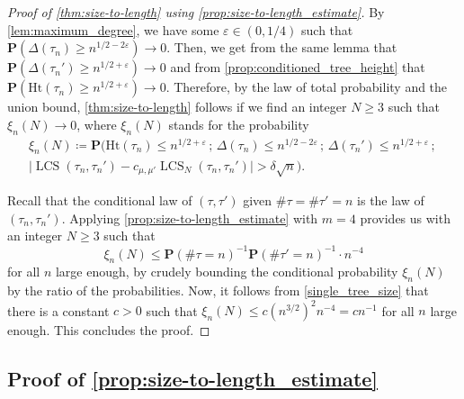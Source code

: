 \documentclass[11pt,reqno]{amsart}
\renewcommand{\P}{\mathbf{P}}
\newcommand{\1}{\mathbf{1}}
\newcommand{\0}{\mathbf{0}}
\newcommand{\Ht}{\mathrm{Ht}}
\newcommand{\LCS}{\operatorname{LCS}}
\begin{document}
\begin{proof}[Proof of \cref{thm:size-to-length} using \cref{prop:size-to-length_estimate}]
By \cref{lem:maximum_degree}, we have some $\varepsilon \in (0,1/4)$ such that $\P(\Delta(\tau_n)\geq n^{1/2-2\varepsilon})\to 0$. Then, we get from the same lemma that $\P(\Delta(\tau_n')\geq n^{1/2+\varepsilon})\to 0$ and from \cref{prop:conditioned_tree_height} that $\P(\Ht(\tau_n)\geq n^{1/2+\varepsilon})\to 0$. Therefore, by the law of total probability and the union bound, \cref{thm:size-to-length} follows if we find an integer $N\geq 3$ such that $\xi_n(N)\to 0$, where $\xi_n(N)$ stands for the probability
\begin{multline*}
\xi_n(N) \coloneqq \P\big(\Ht(\tau_n)\leq n^{1/2+\varepsilon} \, ;\, \Delta(\tau_n)\leq n^{1/2-2\varepsilon}\, ;\, \Delta(\tau_n')\leq n^{1/2+\varepsilon}\, ;\, \\
\big|\LCS(\tau_n,\tau_n') - c_{\mu,\mu'}\LCS_N(\tau_n,\tau_n')\big|>\delta\sqrt{n}\big).
\end{multline*}

Recall that the conditional law of $(\tau,\tau')$ given $\#\tau=\#\tau'=n$ is the law of $(\tau_n,\tau_n')$. Applying \cref{prop:size-to-length_estimate} with $m=4$ provides us with an integer $N\geq 3$ such that
\[\xi_n(N)\leq  \P(\#\tau=n)^{-1}\P(\#\tau'=n)^{-1}\cdot n^{-4}\]
for all $n$ large enough, by crudely bounding the conditional probability $\xi_n(N)$ by the ratio of the probabilities. Now, it follows from \cref{single_tree_size} that there is a constant $c>0$ such that $\xi_n(N)\leq c( n^{3/2})^2 n^{-4}= cn^{-1}$ for all $n$ large enough. This concludes the proof.
\end{proof}



\subsection{Proof of \cref{prop:size-to-length_estimate}}
\end{document}
